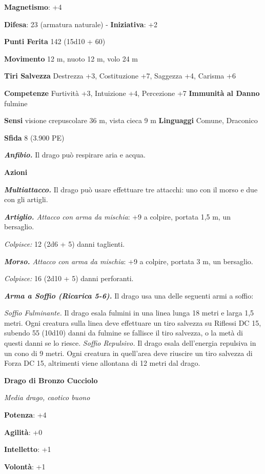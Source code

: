 \begin{multicols}{2}
\textbf{Magnetismo}: +4

\textbf{Difesa}: 23 (armatura naturale) - \textbf{Iniziativa}: +2

\textbf{Punti Ferita} 142 (15d10 + 60)

\textbf{Movimento} 12 m, nuoto 12 m, volo 24 m

\textbf{Tiri Salvezza} Destrezza +3, Costituzione +7, Saggezza +4,
Carisma +6

\textbf{Competenze} Furtività +3, Intuizione +4, Percezione +7
\textbf{Immunità al Danno} fulmine

\textbf{Sensi} visione crepuscolare 36 m, vista cieca 9 m
\textbf{Linguaggi} Comune, Draconico

\textbf{Sfida} 8 (3.900 PE)

\emph{\textbf{Anfibio.}} Il drago può respirare aria e acqua.

\textbf{Azioni}

\emph{\textbf{Multiattacco.}} Il drago può usare effettuare tre
attacchi: uno con il morso e due con gli artigli.

\emph{\textbf{Artiglio.} Attacco con arma da mischia}: +9 a colpire,
portata 1,5 m, un bersaglio.

\emph{Colpisce:} 12 (2d6 + 5) danni taglienti.

\emph{\textbf{Morso.} Attacco con arma da mischia}: +9 a colpire,
portata 3 m, un bersaglio.

\emph{Colpisce:} 16 (2d10 + 5) danni perforanti.

\emph{\textbf{Arma a Soffio (Ricarica 5-6).}} Il drago usa una delle
seguenti armi a soffio:

\emph{Soffio Fulminante.} Il drago esala fulmini in una linea lunga 18
metri e larga 1,5 metri. Ogni creatura sulla linea deve effettuare un
tiro salvezza su Riflessi DC 15, subendo 55 (10d10) danni da fulmine se
fallisce il tiro salvezza, o la metà di questi danni se lo riesce.
\emph{Soffio Repulsivo.} Il drago esala dell'energia repulsiva in un
cono di 9 metri. Ogni creatura in quell'area deve riuscire un tiro
salvezza di Forza DC 15, altrimenti viene allontana di 12 metri dal
drago.

\textbf{Drago di Bronzo Cucciolo}

\emph{Media drago, caotico buono}

\textbf{Potenza}: +4

\textbf{Agilità}: +0

\textbf{Intelletto}: +1

\textbf{Volontà}: +1


\end{multicols}
